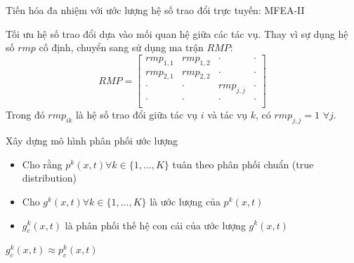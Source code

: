 	\begin{frame}{Tiến hóa đa nhiệm với ước lượng hệ số trao đổi trực tuyến: MFEA-II}
		\begin{itemize}
		    \begin{block}{Tối ưu hệ số trao đổi dựa vào mối quan hệ giữa các tác vụ.}
                Thay vì sự dụng hệ số $rmp$ cố định, chuyển sang sử dụng ma trận $RMP$:
                \begin{equation}
                    RMP =
                    \begin{bmatrix}
                        rmp_{1,1} & rmp_{1,2} & \cdot & \cdot \\
                        rmp_{2,1} & rmp_{2,2} & \cdot & \cdot \\
                        \cdot & \cdot & rmp_{j,j} & \cdot \\
                        \cdot & \cdot & \cdot & \cdot \\
                    \end{bmatrix}
                \end{equation}
                Trong đó $rmp_{ik}$ là hệ số trao đổi giữa tác vụ $i$ và tác vụ $k$, có $rmp_{j,j} = 1$ $\forall j$.
			\end{block} \pause
			\begin{block}{Xây dựng mô hình phân phối ước lượng}
                \begin{itemize}
                    \item Cho rằng $p^k(x,t) \forall k \in \{1, ..., K\}$ tuân theo phân phối chuẩn (true distribution) 
                    \item Cho $g^k(x,t) \forall k \in \{1, ..., K\}$ là ước lượng của $p^k(x,t)$ 
                    \item $g_c^k(x,t)$ là phân phối thế hệ con cái của ước lượng $g^k(x,t)$
                \end{itemize}
                \Rightarrow \textbf{$g_c^k(x,t) \approx p_c^k(x,t)$}
			\end{block}
		\end{itemize}
	\end{frame}
